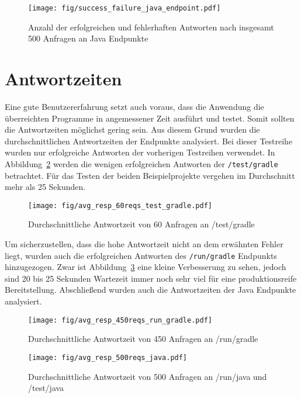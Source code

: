 \begin{figure}
  \centering
  \texttt{[image: fig/success\_failure\_java\_endpoint.pdf]}
  \caption{Anzahl der erfolgreichen und fehlerhaften Antworten nach insgesamt 500 Anfragen an Java Endpunkte}
  \label{fig:success_failure_java_endpoint}
\end{figure}

\section{Antwortzeiten}
Eine gute Benutzererfahrung setzt auch voraus, dass die Anwendung die überreichten Programme in
angemessener Zeit ausführt und testet. Somit sollten die Antwortzeiten möglichst gering sein.
Aus diesem Grund wurden die durchschnittlichen Antwortzeiten der Endpunkte analysiert.
Bei dieser Testreihe wurden nur erfolgreiche Antworten der vorherigen Testreihen verwendet.
In Abbildung~\ref{fig:avg_resp_60reqs_test_gradle} werden die wenigen erfolgreichen Antworten
der \texttt{/test/gradle} betrachtet. Für das Testen der beiden Beispielprojekte vergehen
im Durchschnitt mehr als 25 Sekunden.

\begin{figure}
  \centering
  \texttt{[image: fig/avg\_resp\_60reqs\_test\_gradle.pdf]}
  \caption{Durchschnittliche Antwortzeit von 60 Anfragen an /test/gradle}
  \label{fig:avg_resp_60reqs_test_gradle}
\end{figure}

Um sicherzustellen, dass die hohe Antwortzeit nicht an dem erwähnten Fehler liegt, wurden auch
die erfolgreichen Antworten des \texttt{/run/gradle} Endpunkts hinzugezogen. Zwar
ist Abbildung~\ref{fig:avg_resp_450reqs_run_gradle} eine kleine Verbesserung zu sehen,
jedoch sind 20 bis 25 Sekunden Wartezeit immer noch sehr viel für eine produktionsreife
Bereitstellung. Abschließend wurden auch die Antwortzeiten der Java
Endpunkte analysiert.

\begin{figure}
  \centering
  \texttt{[image: fig/avg\_resp\_450reqs\_run\_gradle.pdf]}
  \caption{Durchschnittliche Antwortzeit von 450 Anfragen an /run/gradle}
  \label{fig:avg_resp_450reqs_run_gradle}
\end{figure}

\begin{figure}
  \centering
  \texttt{[image: fig/avg\_resp\_500reqs\_java.pdf]}
  \caption{Durchschnittliche Antwortzeit von 500 Anfragen an /run/java und /test/java}
  \label{fig:avg_resp_500reqs_java}
\end{figure}

